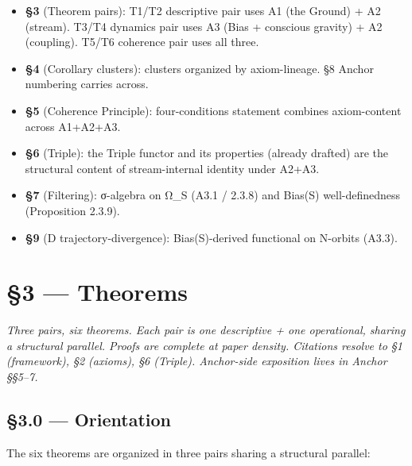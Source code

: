 \documentclass[11pt, openany]{book}
\newcommand{\sectionbreak}{\clearpage}
\begin{document}
\begin{itemize}
\item \textbf{§3} (Theorem pairs): T1/T2 descriptive pair uses A1 (the Ground) + A2 (stream). T3/T4 dynamics pair uses A3 (Bias + conscious gravity) + A2 (coupling). T5/T6 coherence pair uses all three.
\item \textbf{§4} (Corollary clusters): clusters organized by axiom-lineage. §8 Anchor numbering carries across.
\item \textbf{§5} (Coherence Principle): four-conditions statement combines axiom-content across A1+A2+A3.
\item \textbf{§6} (Triple): the Triple functor and its properties (already drafted) are the structural content of stream-internal identity under A2+A3.
\item \textbf{§7} (Filtering): σ-algebra on Ω\_\allowbreak{}S (A3.1 / 2.3.8) and Bias(S) well-definedness (Proposition 2.3.9).
\item \textbf{§9} (D trajectory-divergence): Bias(S)-derived functional on N-orbits (A3.3).
\end{itemize}

\sectionbreak


\chapter{§3 — Theorems}


\textit{Three pairs, six theorems. Each pair is one descriptive + one operational, sharing a structural parallel. Proofs are complete at paper density. Citations resolve to §1 (framework), §2 (axioms), §6 (Triple). Anchor-side exposition lives in Anchor §§5–7.}

\sectionbreak

\section{§3.0 --- Orientation}

The six theorems are organized in three pairs sharing a structural parallel:
\end{document}
